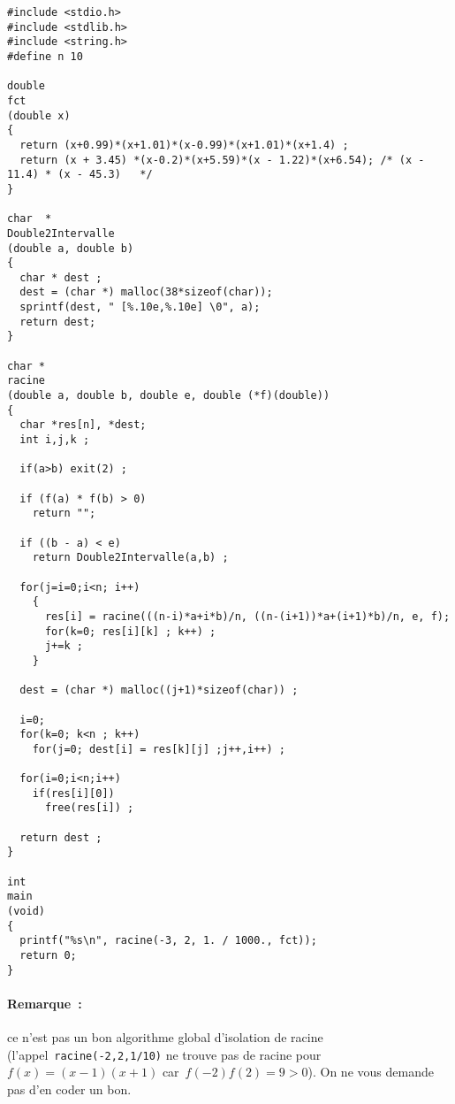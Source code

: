 \begin{verbatim}
#include <stdio.h>
#include <stdlib.h>
#include <string.h>
#define n 10

double
fct
(double x) 
{
  return (x+0.99)*(x+1.01)*(x-0.99)*(x+1.01)*(x+1.4) ;
  return (x + 3.45) *(x-0.2)*(x+5.59)*(x - 1.22)*(x+6.54); /* (x - 11.4) * (x - 45.3)   */
}

char  *
Double2Intervalle
(double a, double b)
{
  char * dest ;
  dest = (char *) malloc(38*sizeof(char));
  sprintf(dest, " [%.10e,%.10e] \0", a);
  return dest;
}

char *
racine
(double a, double b, double e, double (*f)(double)) 
{
  char *res[n], *dest;
  int i,j,k ;

  if(a>b) exit(2) ;
  
  if (f(a) * f(b) > 0)
    return "";

  if ((b - a) < e) 
    return Double2Intervalle(a,b) ;  

  for(j=i=0;i<n; i++) 
    {
      res[i] = racine(((n-i)*a+i*b)/n, ((n-(i+1))*a+(i+1)*b)/n, e, f);
      for(k=0; res[i][k] ; k++) ;
      j+=k ;
    }

  dest = (char *) malloc((j+1)*sizeof(char)) ;

  i=0;
  for(k=0; k<n ; k++) 
    for(j=0; dest[i] = res[k][j] ;j++,i++) ;

  for(i=0;i<n;i++) 
    if(res[i][0]) 
      free(res[i]) ;

  return dest ;
}

int
main
(void) 
{
  printf("%s\n", racine(-3, 2, 1. / 1000., fct));
  return 0;
}

\end{verbatim}
\fi%
\paragraph{Remarque~:} ce n'est pas un bon algorithme global d'isolation de
racine (l'appel~\verb+racine(-2,2,1/10)+ ne trouve pas de racine
pour~${f(x)=(x-1)(x+1)}$ car~${f(-2)f(2)=9>0}$). On ne vous demande pas d'en coder un bon.
